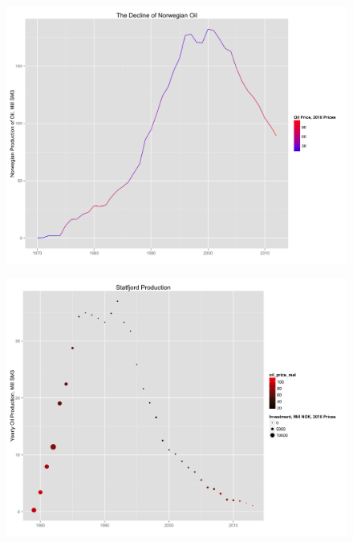 \documentclass{beamer}
\begin{document}
\begin{frame}[plain]
	\begin{figure}
	\includegraphics[width=1\textwidth]{oil_decline.png}
	\end{figure}
\end{frame}



\begin{frame}[plain]
	\begin{figure}
	\includegraphics[width=1\textwidth]{statfjord_plot.png}
	\end{figure}
\end{frame}
\end{document}
